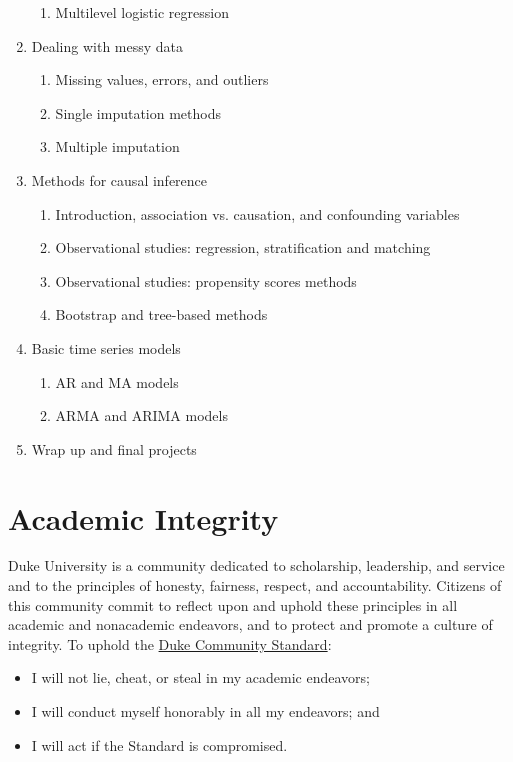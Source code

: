 \documentclass[11pt, a4paper]{article}
\begin{document}
\begin{enumerate}[label= {\color{darkblue}{\ArrowBoldRightStrobe}}]
\begin{enumerate}[label= {\color{cyan}{\Rectangle}}]
		\item Multilevel logistic regression
	\end{enumerate}
	\item Dealing with messy data
	\begin{enumerate}[label= {\color{cyan}{\Rectangle}}]
		\item Missing values, errors, and outliers
		\item Single imputation methods
		\item Multiple imputation
	\end{enumerate}
	\item Methods for causal inference
	\begin{enumerate}[label= {\color{cyan}{\Rectangle}}]
		\item Introduction, association vs. causation, and confounding variables
		\item Observational studies: regression, stratification and matching
		\item Observational studies: propensity scores methods
		\item Bootstrap and tree-based methods
	\end{enumerate}
	\item Basic time series models
	\begin{enumerate}[label= {\color{cyan}{\Rectangle}}]
		\item AR and MA models
		\item ARMA and ARIMA models
	\end{enumerate}
	\item Wrap up and final projects
\end{enumerate}


\section{Academic Integrity}  
Duke University is a community dedicated to scholarship, leadership, and service and to the principles of honesty, fairness, respect, and accountability. Citizens of this community commit to reflect upon and uphold these principles in all academic and nonacademic endeavors, and to protect and promote a culture of integrity. To uphold the \href{https://studentaffairs.duke.edu/conduct/about-us/duke-community-standard}{Duke Community Standard}:
\begin{itemize}[label= {\color{darkred}{\Large \HandRight}}]
	\item I will not lie, cheat, or steal in my academic endeavors;
	\item I will conduct myself honorably in all my endeavors; and
	\item I will act if the Standard is compromised.
\end{itemize}
\end{document}
